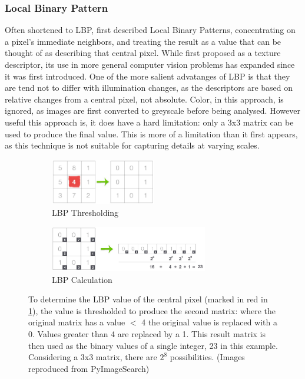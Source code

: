 \documentclass[letterpaper]{article}
\begin{document}
{\subsubsection{Local Binary Pattern}
Often shortened to LBP, \citeauthor{Ojala1996-ps} first described Local Binary Patterns, concentrating on a pixel's immediate neighbors, and treating the result as a value that can be thought of as describing that central pixel. While first proposed as a texture descriptor, its use in more general computer vision problems has expanded since it was first introduced. One of the more salient advatanges of LBP is that they are tend not to differ with illumination changes, as the descriptors are based on relative changes from a central pixel, not absolute. Color, in this approach, is ignored, as images are first converted to greyscale before being analysed. However useful this approach is, it does have a hard limitation: only a 3x3 matrix can be used to produce the final value. This is more of a limitation than it first appears, as this technique is not suitable for capturing details at varying scales.

\begin{figure}[H]
	\begin{subfigure}[h]{0.48\linewidth}
		\centering
		\includegraphics[height=2cm]{./figures/lbp_thresholding.jpg}
		\caption{LBP Thresholding}
		\label{subfig:lbp-thresholding}	
	\end{subfigure}
	\hfill
	\begin{subfigure}[h]{0.48\linewidth}
		\centering
		\includegraphics[height=2cm]{./figures/lbp_calculation.jpg}
		\caption{LBP Calculation}
		\label{subfig:lbp-calculation}		
	\end{subfigure}%
	\caption[Local Binary Pattern thresholding and calculation]{To determine the LBP value of the central pixel (marked in red in \ref{subfig:lbp-thresholding}), the value is thresholded to produce the second matrix: where the original matrix has a value $<$ 4 the original value is replaced with a 0. Values greater than 4 are replaced by a 1. This result matrix is then used as the binary values of a single integer, 23 in this example. Considering a 3x3 matrix, there are $2^8$ possibilities. (Images reproduced from PyImageSearch)}
	\label{fig:lbp}
\end{figure}

}
\end{document}
